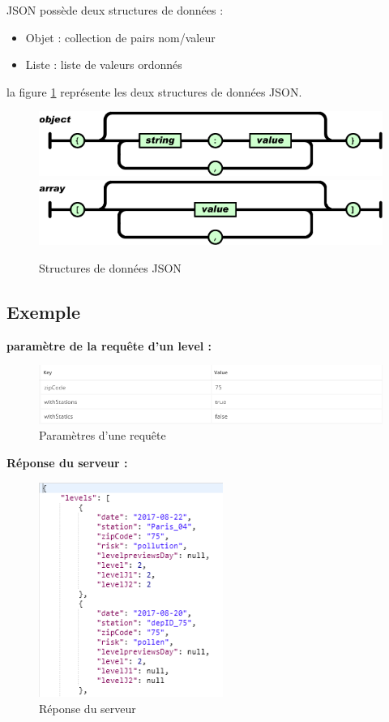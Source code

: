 JSON possède deux structures de données :
\begin{itemize}
	\item Objet : collection de pairs nom/valeur
	\item Liste : liste de valeurs ordonnés
\end{itemize}

la figure \ref{figB1} représente les deux structures de données JSON.\\

\begin{figure}[!h]
	\begin{center}
		\includegraphics[width=14.7cm]{figures/object.png}
		\includegraphics[width=14.7cm]{figures/array.png}
	\end{center}
\caption{Structures de données JSON}
\label{figB1}
\end{figure}
\newpage
\subsection{Exemple}
\textbf{paramètre de la requête d'un level :}

\begin{figure}[!h]
	\begin{center}
		\includegraphics[width=14cm]{figures/param.png}
	\end{center}
	\caption{Paramètres d'une requête}
	\label{figB2}
\end{figure}

\textbf{Réponse du serveur :}

\begin{figure}[!h]
	\begin{center}
		\includegraphics[width=6cm]{figures/reponse.png}
	\end{center}
	\caption{Réponse du serveur}
	\label{figB3}
\end{figure}

 